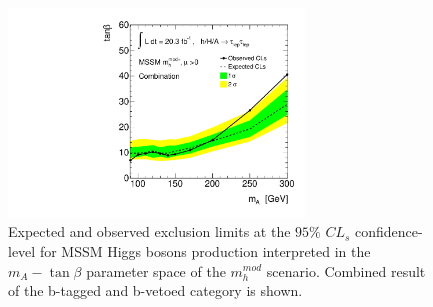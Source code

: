%
\begin{figure}[!t]
  \centering
  \includegraphics[width=0.7\textwidth]{figure/limits/mhmod_comb.pdf}
  \caption{Expected and observed  exclusion limits at the $95\%$ $CL_s$ confidence-level for MSSM Higgs bosons production 
   interpreted in the  $m_A - \tan\beta$ parameter space of the $m_h^{mod}$ scenario. 
	Combined result of the  b-tagged and b-vetoed category is shown.}
\label{fig:limit_extract_combined}
\end{figure}

